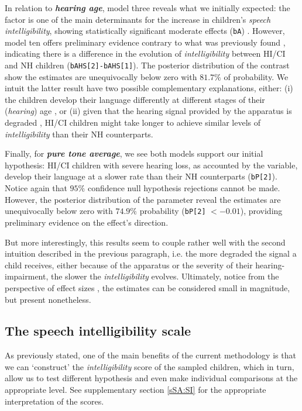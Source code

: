 In relation to \textbf{\textit{hearing age}}, model three reveals what we initially expected: the factor is one of the main determinants for the increase in children's \textit{speech intelligibility}, showing statistically significant moderate effects (\texttt{bA}) \cite{Cohen_1988, Sawilowsky_2009}. However, model ten offers preliminary evidence contrary to what was previously found \cite{Boonen_et_al_2021}, indicating there is a difference in the evolution of \textit{intelligibility} between HI/CI and NH children (\texttt{bAHS[2]-bAHS[1]}). The posterior distribution of the contrast show the estimates are unequivocally below zero with $81.7\%$ of probability. We intuit the latter result have two possible complementary explanations, either: (i) the children develop their language differently at different stages of their (\textit{hearing}) age \cite{Flexer_2011}, or (ii) given that the hearing signal provided by the apparatus is degraded \cite{Drennan_et_al_2008}, HI/CI children might take longer to achieve similar levels of \textit{intelligibility} than their NH counterparts.

Finally, for \textbf{\textit{pure tone average}}, we see both models support our initial hypothesis: HI/CI children with severe hearing loss, as accounted by the variable, develop their language at a slower rate than their NH counterparts (\texttt{bP[2]}). Notice again that $95\%$ confidence null hypothesis rejections cannot be made. However, the posterior distribution of the parameter reveal the estimates are unequivocally below zero with $74.9\%$ probability (\texttt{bP[2]} $< -0.01$), providing preliminary evidence on the effect's direction. 

But more interestingly, this results seem to couple rather well with the second intuition described in the previous paragraph, i.e. the more degraded the signal a child receives, either because of the apparatus or the severity of their hearing-impairment, the slower the \textit{intelligibility} evolves. Ultimately, notice from the perspective of effect sizes \cite{Cohen_1988, Sawilowsky_2009}, the estimates can be considered small in magnitude, but present nonetheless. 
%
%
\subsection{The speech intelligibility scale} \label{sS:results_scales}
%
As previously stated, one of the main benefits of the current methodology is that we can `construct' the \textit{intelligibility} score of the sampled children, which in turn, allow us to test different hypothesis and even make individual comparisons at the appropriate level. See supplementary section \ref{sSA:SI} for the appropriate interpretation of the scores.

